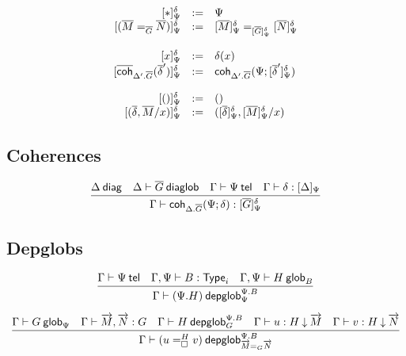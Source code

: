 \begin{small}
  \[
  \begin{array}{rcl}
    \interpglob{\diagbase}{\Psi}{\delta} & := & \Psi \\
    \interpglob{(\homj{\diag G}{\diag M}{\diag N})}{\Psi}{\delta} & := &
    \homj{\interpglob{\diag G}{\Psi}{\delta}}{\interpglob{\diag M}{\Psi}{\delta}}
    {\interpglob{\diag N}{\Psi}{\delta}}\\\\

    \interpglob{x}{\Psi}{\delta} & := & \delta(x) \\
    \interpglob{\diagcoh{\Delta'.\diag{G}}{\diag \delta'}}{\Psi}{\delta} & := &
    \coh{\Delta'.\diag G}{\Psi}{\interpglob{\diag\delta'}{\Psi}{\delta}}\\\\

    \interpglob{()}{\Psi}{\delta} & := & () \\
    \interpglob{(\diag \delta,\diag M/x)}{\Psi}{\delta} & := &
    (\interpglob{\diag\delta}{\Psi}{\delta},\interpglob{\diag
    M}{\Psi}{\delta}/x)
  \end{array}
  \]
\end{small}

\subsection{Coherences}

\begin{small}
  \[
  \infer{\ofglob{\Gamma}{\coh{{\Delta}.\diag{G}}{\Psi}{\delta}}
    {\interpglob{\diag{G}}{\Psi}{\delta}}}
  {\wfdiag{\Delta}
    & \wfdiaglob{\Delta}{\diag G}
    & \wftel{\Gamma}{\Psi}
    & \ofinterp{\Gamma}{\delta}{\Delta}{\Psi}}
  \]
\end{small}

\subsection{Depglobs}

\begin{small}
  \[\infer{\wfdepglob{\Gamma}{(\Psi.H)}{\Psi.B}{\Psi}}
  {\wftel{\Gamma}{\Psi}
    & \wftype{\Gamma,\Psi}{B}
    & \wfglob{\Gamma,\Psi}{H}{B}
  }\]

  \[\infer{\wfdepglob{\Gamma}{(\dhomj{H}{u}{v}{\blank})}
    {\Psi.B}{\homj{G}{\tel{M}}{\tel{N}}}}
  {\wfglob{\Gamma}{G}{\Psi}
    & \ofglob{\Gamma}{\tel{M},\tel{N}}{G}
    & \wfdepglob{\Gamma}{H}{\Psi.B}{G}
    & \ofdepglob{\Gamma}{u}{H}{\tel{M}}
    & \ofdepglob{\Gamma}{v}{H}{\tel{N}}}\]
\end{small}

